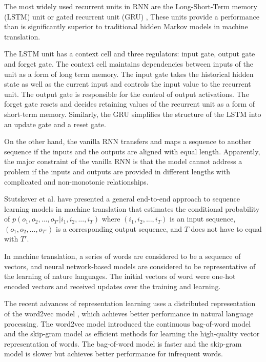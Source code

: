 The most widely used recurrent units in RNN are the
Long-Short-Term memory (LSTM) unit \cite{hochreiter1997lstm} 
or gated recurrent unit (GRU) \cite{DBLP:journals/corr/ChoMGBSB14}, These units provide a
performance than is significantly superior to traditional hidden Markov models 
in machine translation\cite{DBLP:journals/corr/abs-1901-01122}.

The LSTM unit has a context cell and three regulators: input gate, 
output gate and forget gate.
The context cell maintains dependencies between inputs of the unit as a form of long term memory. 
The input gate takes the historical hidden state as well as the current input and controls 
the input value to the recurrent unit. The output gate is responsible for the control of output activations. 
The forget gate resets and decides retaining values of the recurrent unit as a form of short-term memory.
Similarly, the GRU simplifies the structure of the LSTM into an update gate and a reset gate.

On the other hand, the vanilla RNN transfers and maps a sequence to another sequence if 
the inputs and the outputs are aligned with equal length. 
Apparently, the major constraint of the vanilla RNN
is that the model cannot address a problem if the inputs and outputs are provided 
in different lengths with complicated and non-monotonic relationships.

Stutskever et al. \cite{DBLP:journals/corr/SutskeverVL14} have presented a general end-to-end approach
to sequence learning models in machine translation that estimates the conditional probability of 
$p(o_1, o_2, ..., o_{T'} | i_1, i_2, ..., i_T)$ where $(i_1, i_2, ..., i_T)$ is an input sequence,
$(o_1, o_2, ..., o_{T'})$ is a corresponding output sequence, and $T$ does not have to equal with $T'$.

In machine translation, a series of words are considered to be a sequence of
vectors, and neural network-based models are considered to be representative of 
the learning of nature languages.
The initial vectors of word were one-hot encoded vectors and received updates over the training and learning.

The recent advances of representation learning uses a distributed representation 
of the word2vec model \cite{DBLP:journals/corr/abs-1301-3781}, which achieves better 
performance in natural language processing. The word2vec model introduced the 
continuous bag-of-word model and the skip-gram model as efficient methods for learning the high-quality
vector representation of words. The bag-of-word model is faster and the skip-gram model is slower 
but achieves better performance for infrequent words.

